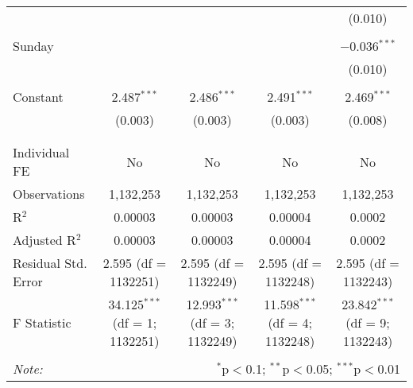 \documentclass[
]{article}
\begin{document}
\begin{table}[!htbp]
{\begin{tabular}{@{\extracolsep{5pt}}lcccc}
  &  &  &  & (0.010) \\ 
  & & & & \\ 
 Sunday &  &  &  & $-$0.036$^{***}$ \\ 
  &  &  &  & (0.010) \\ 
  & & & & \\ 
 Constant & 2.487$^{***}$ & 2.486$^{***}$ & 2.491$^{***}$ & 2.469$^{***}$ \\ 
  & (0.003) & (0.003) & (0.003) & (0.008) \\ 
  & & & & \\ 
\hline \\[-1.8ex] 
Individual FE & No & No & No & No \\ 
Observations & 1,132,253 & 1,132,253 & 1,132,253 & 1,132,253 \\ 
R$^{2}$ & 0.00003 & 0.00003 & 0.00004 & 0.0002 \\ 
Adjusted R$^{2}$ & 0.00003 & 0.00003 & 0.00004 & 0.0002 \\ 
Residual Std. Error & 2.595 (df = 1132251) & 2.595 (df = 1132249) & 2.595 (df = 1132248) & 2.595 (df = 1132243) \\ 
F Statistic & 34.125$^{***}$ (df = 1; 1132251) & 12.993$^{***}$ (df = 3; 1132249) & 11.598$^{***}$ (df = 4; 1132248) & 23.842$^{***}$ (df = 9; 1132243) \\ 
\hline 
\hline \\[-1.8ex] 
\textit{Note:}  & \multicolumn{4}{r}{$^{*}$p$<$0.1; $^{**}$p$<$0.05; $^{***}$p$<$0.01} \\ 
\end{tabular}
} 
\end{table} 
\newpage
\end{document}
